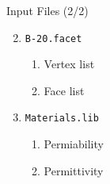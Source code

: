\begin{frame}{Input Files (2/2)}
    \begin{enumerate}
        \setcounter{enumi}{1} %
        \item \texttt{B-20.facet}
        \begin{enumerate}
            \item Vertex list
            \item Face list 
        \end{enumerate}
        \item \texttt{Materials.lib}
        \begin{enumerate}
            \item Permiability
            \item Permittivity
        \end{enumerate}
    \end{enumerate}
\end{frame}

%

